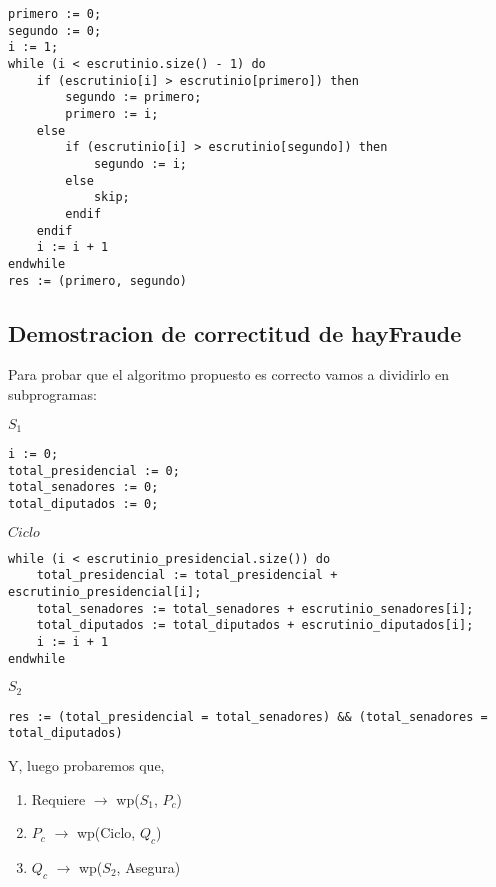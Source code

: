 \documentclass[10pt,a4paper]{article}
\begin{document}
	\begin{lstlisting}[caption={},label=code:for]
primero := 0;
segundo := 0;
i := 1;
while (i < escrutinio.size() - 1) do
	if (escrutinio[i] > escrutinio[primero]) then
		segundo := primero;
		primero := i;
	else
		if (escrutinio[i] > escrutinio[segundo]) then
			segundo := i;
		else
			skip;
		endif
	endif
	i := i + 1
endwhile
res := (primero, segundo)
	\end{lstlisting}


\subsection{Demostracion de correctitud de hayFraude}



Para probar que el algoritmo propuesto es correcto vamos a dividirlo en subprogramas:

\vspace{0.3cm}

$S_1$
	\begin{lstlisting}[caption={},label=code:for]
i := 0;
total_presidencial := 0;
total_senadores := 0;
total_diputados := 0;
	\end{lstlisting}

\vspace{0.3cm}

$Ciclo$
	\begin{lstlisting}[caption={},label=code:for]
while (i < escrutinio_presidencial.size()) do
	total_presidencial := total_presidencial + escrutinio_presidencial[i];
	total_senadores := total_senadores + escrutinio_senadores[i];
	total_diputados := total_diputados + escrutinio_diputados[i];
	i := i + 1
endwhile
	\end{lstlisting}

\vspace{0.3cm}

$S_2$


	\begin{lstlisting}[caption={},label=code:for]
res := (total_presidencial = total_senadores) && (total_senadores = total_diputados)
	\end{lstlisting}

\vspace{0.3cm}

Y, luego probaremos que,


\begin{enumerate}\setlength{\itemindent}{0.5cm}
		\item Requiere $\rightarrow$ wp($S_1$, $P_c$)
		\item $P_c$ $\rightarrow$ wp(Ciclo, $Q_c$)
		\item $Q_c$ $\rightarrow$ wp($S_2$, Asegura)
\end{enumerate}
\end{document}
